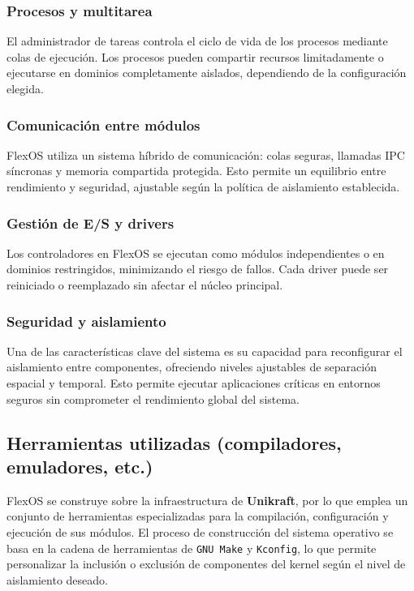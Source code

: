 \subsubsection*{Procesos y multitarea}
El administrador de tareas controla el ciclo de vida de los procesos mediante colas de ejecución.  
Los procesos pueden compartir recursos limitadamente o ejecutarse en dominios completamente aislados, dependiendo de la configuración elegida.

\subsubsection*{Comunicación entre módulos}
FlexOS utiliza un sistema híbrido de comunicación: colas seguras, llamadas IPC síncronas y memoria compartida protegida.  
Esto permite un equilibrio entre rendimiento y seguridad, ajustable según la política de aislamiento establecida.

\subsubsection*{Gestión de E/S y drivers}
Los controladores en FlexOS se ejecutan como módulos independientes o en dominios restringidos, minimizando el riesgo de fallos.  
Cada driver puede ser reiniciado o reemplazado sin afectar el núcleo principal.

\subsubsection*{Seguridad y aislamiento}
Una de las características clave del sistema es su capacidad para reconfigurar el aislamiento entre componentes, ofreciendo niveles ajustables de separación espacial y temporal.  
Esto permite ejecutar aplicaciones críticas en entornos seguros sin comprometer el rendimiento global del sistema.


\subsection{Herramientas utilizadas (compiladores, emuladores, etc.)}

FlexOS se construye sobre la infraestructura de \textbf{Unikraft}, por lo que emplea un conjunto de herramientas especializadas para la compilación, configuración y ejecución de sus módulos.  
El proceso de construcción del sistema operativo se basa en la cadena de herramientas de \texttt{GNU Make} y \texttt{Kconfig}, lo que permite personalizar la inclusión o exclusión de componentes del kernel según el nivel de aislamiento deseado.  

